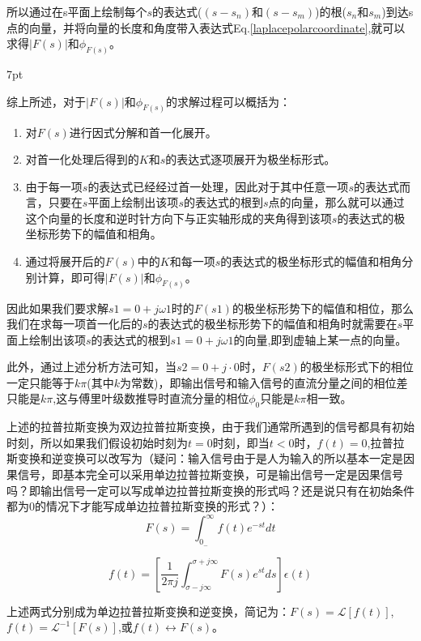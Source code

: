 \documentclass{article}
\numberwithin{equation}{section}
\numberwithin{figure}{section}
\newenvironment{formal}{%
\def\FrameCommand{%
\hspace{1pt}%
{\color{DarkBlue}\vrule width 2pt}%
{\color{formalshade}\vrule width 4pt}%
\colorbox{formalshade}%
}%
\MakeFramed{\advance\hsize-\width\FrameRestore}%
\noindent\hspace{-4.55pt}%
\begin{adjustwidth}{}{7pt}%
\vspace{2pt}\vspace{2pt}%
}
{%
\vspace{2pt}\end{adjustwidth}\endMakeFramed%
}
\begin{document}
所以通过在s平面上绘制每个$s$的表达式($(s-s_n)$和$(s-s_m)$)的根($s_n$和$s_m$)到达s点的向量，并将向量的长度和角度带入表达式Eq.\ref{laplacepolarcoordinate},就可以求得$|F(s)|$和$\phi_{F(s)}$。

\begin{formal}
    综上所述，对于$|F(s)|$和$\phi_{F(s)}$的求解过程可以概括为：
\begin{enumerate}
    \item 对$F(s)$进行因式分解和首一化展开。
    \item 对首一化处理后得到的$K$和$s$的表达式逐项展开为极坐标形式。
    \item 由于每一项$s$的表达式已经经过首一处理，因此对于其中任意一项$s$的表达式而言，只要在$s$平面上绘制出该项$s$的表达式的根到$s$点的向量，那么就可以通过这个向量的长度和逆时针方向下与正实轴形成的夹角得到该项$s$的表达式的极坐标形势下的幅值和相角。
    \item 通过将展开后的$F(s)$中的$K$和每一项$s$的表达式的极坐标形式的幅值和相角分别计算，即可得$|F(s)|$和$\phi_{F(s)}$。
\end{enumerate}
\end{formal}

因此如果我们要求解$s1=0+j\omega1$时的$F(s1)$的极坐标形势下的幅值和相位，那么我们在求每一项首一化后的$s$的表达式的极坐标形势下的幅值和相角时就需要在$s$平面上绘制出该项$s$的表达式的根到$s1=0+j\omega1$的向量,即到虚轴上某一点的向量。

此外，通过上述分析方法可知，当$s2=0+j·0$时，$F(s2)$的极坐标形式下的相位一定只能等于$k\pi$(其中$k$为常数)，即输出信号和输入信号的直流分量之间的相位差只能是$k\pi$,这与傅里叶级数推导时直流分量的相位$\phi_0$只能是$k\pi$相一致。

上述的拉普拉斯变换为双边拉普拉斯变换，由于我们通常所遇到的信号都具有初始时刻，所以如果我们假设初始时刻为$t=0$时刻，即当$t<0$时，$f(t)=0$,拉普拉斯变换和逆变换可以改写为（疑问：输入信号由于是人为输入的所以基本一定是因果信号，即基本完全可以采用单边拉普拉斯变换，可是输出信号一定是因果信号吗？即输出信号一定可以写成单边拉普拉斯变换的形式吗？还是说只有在初始条件都为0的情况下才能写成单边拉普拉斯变换的形式？）：
\begin{equation}
        F(s)=\int_{0_-}^{\infty}f(t)e^{-st}dt
\end{equation}

\begin{equation}
    f(t)=[\frac{1}{2\pi j}\int_{\sigma-j\infty}^{\sigma+j\infty}F(s)e^{st}ds]\epsilon(t)
\end{equation}

上述两式分别成为单边拉普拉斯变换和逆变换，简记为：$F(s)=\mathscr{L}[f(t)]$,$f(t)=\mathscr{L}^{-1}[F(s)]$,或$f(t)\leftrightarrow F(s)$。
\end{document}
